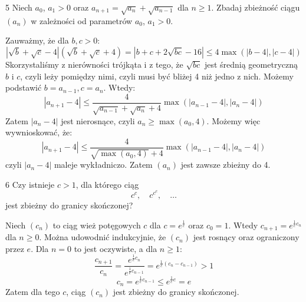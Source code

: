 \documentclass{../note}
\begin{document}
\begin{zadanie}{5}
Niech $a_{0}$, $a_{1}>0$ oraz $a_{n+1}=\sqrt{a_{n}}+\sqrt{a_{n-1}}$ dla $n\ge1$. Zbadaj zbieżność ciągu $(a_{n})$ w zależności od parametrów $a_{0}$, $a_{1}>0$.
\end{zadanie}
\begin{rozwiazanie}
Zauważmy, że dla $b, c > 0$:
\[|\sqrt{b} + \sqrt{c} - 4|(\sqrt{b} + \sqrt{c} + 4) = |b + c + 2\sqrt{bc} - 16| \leq 4\max(|b-4|, |c-4|)\]
Skorzystaliśmy z nierówności trójkąta i z tego, że $\sqrt{bc}$ jest średnią geometryczną $b$ i $c$, czyli leży pomiędzy nimi, czyli musi być bliżej 4 niż jedno z nich. Możemy podstawić $b=a_{n-1}, c=a_n$. Wtedy:
\[|a_{n+1} - 4| \leq \frac{4}{\sqrt{a_{n-1}} + \sqrt{a_n} + 4}\max(|a_{n-1}-4|, |a_n-4|)\]
Zatem $|a_n - 4|$ jest nierosnące, czyli $a_n \geq \max(a_0, 4)$. Możemy więc wywnioskować, że:
\[|a_{n+1} - 4| \leq \frac{4}{\sqrt{\max(a_0, 4)} + 4}\max(|a_{n-1}-4|, |a_n-4|)\]
czyli $|a_n - 4|$ maleje wykładniczo. Zatem $(a_n)$ jest zawsze zbieżny do 4.
\end{rozwiazanie}

\begin{zadanie}{6}
Czy istnieje $c>1$, dla którego ciąg
\[
    c^{c}, \quad c^{c^{c}}, \quad \dots
\]
jest zbieżny do granicy skończonej?
\end{zadanie}
\begin{rozwiazanie}
Niech $(c_n)$ to ciąg wież potęgowych $c$ dla $c = e^{\frac1e}$ oraz $c_0 = 1$. Wtedy $c_{n+1} = e^{\frac{1}{e}c_n}$ dla $n \geq 0$. Można udowodnić indukcyjnie, że $(c_n)$ jest rosnący oraz ograniczony przez $e$. Dla $n=0$ to jest oczywiste, a dla $n \geq 1$:
\[\frac{c_{n+1}}{c_n} = \frac{e^{\frac1e c_n}}{e^{\frac1e c_{n-1}}} = e^{\frac1e(c_n - c_{n-1})} > 1\]
\[c_n = e^{\frac1e c_{n-1}} \leq e^{\frac1e e} = e\]
Zatem dla tego $c$, ciąg $(c_n)$ jest zbieżny do granicy skończonej.
\end{rozwiazanie}
\end{document}
